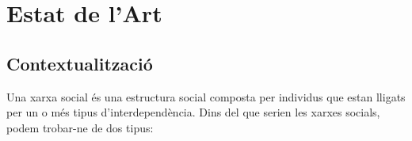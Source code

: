 \documentclass[11pt,catalan,listoffigures,listoftables]{tfgetsinf}
\begin{document}



\section{Estat de l’Art}

\subsection{Contextualització}

Una xarxa social és una estructura social composta per individus que estan lligats per un o més tipus d’interdependència. Dins del que serien les xarxes socials, podem trobar-ne de dos tipus:
\end{document}
